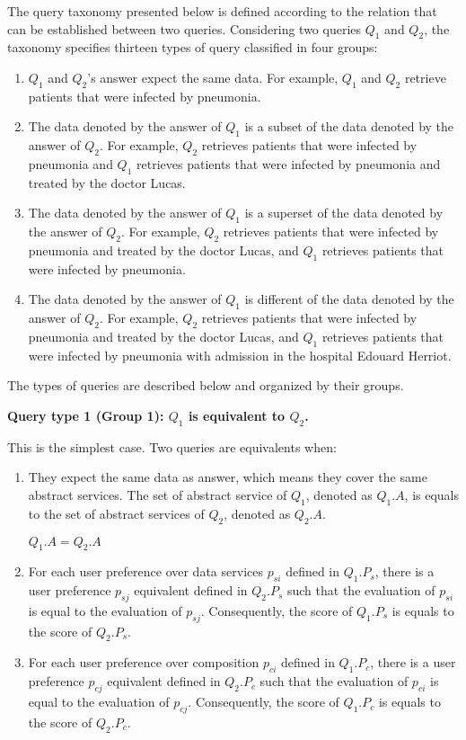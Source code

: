 The query taxonomy presented below is defined according to the relation that can be established between two queries. 
Considering two queries $Q_{1}$ and $Q_{2}$, the taxonomy specifies thirteen types of query classified in four groups: 
\begin{enumerate}
\item $Q_{1}$ and $Q_{2}$'s answer expect the same data. For example, $Q_{1}$ and $Q_{2}$ retrieve patients that were infected by pneumonia.
\item The data denoted by the answer of $Q_{1}$ is a subset of the data denoted by the answer of $Q_{2}$. For example, $Q_{2}$ retrieves patients that were infected by pneumonia and $Q_{1}$ retrieves patients that were infected by pneumonia and treated by the doctor Lucas.
\item The data denoted by the answer of $Q_{1}$ is a superset of the data denoted by the answer of $Q_{2}$. For example, $Q_{2}$ retrieves patients that were infected by pneumonia and treated by the doctor Lucas, and $Q_{1}$ retrieves patients that were infected by pneumonia.
\item The data denoted by the answer of $Q_{1}$ is different of the data denoted by the answer of $Q_{2}$. For example, $Q_{2}$ retrieves patients that were infected by pneumonia and treated by the doctor Lucas, and $Q_{1}$ retrieves patients that were infected by pneumonia with admission in the hospital Edouard Herriot.
\end{enumerate}

The types of queries are described below and organized by their groups.

\bigskip
\noindent \textbf{Query type 1 (Group 1): $Q_{1}$ is equivalent to $Q_{2}$.}

This is the simplest case. Two queries are equivalents when:
\begin{enumerate}
\item They expect the same data as answer, which means they cover the same abstract services. The set of abstract service of $Q_{1}$, denoted as $Q_{1}.A$, is equals to the set of abstract services of $Q_{2}$, denoted as $Q_{2}.A$.
%
\begin{center}
$Q_{1}.A = Q_{2}.A$
\end{center}
%
\item For each user preference over data services $p_{si}$ defined in $Q_{1}.P_{s}$, there is a user preference $p_{sj}$ equivalent defined in $Q_{2}.P_{s}$ such that the evaluation of $p_{si}$ is equal to the evaluation of $p_{sj}$. 
Consequently, the score of $Q_{1}.P_{s}$ is equals to the score of $Q_{2}.P_{s}$.
\item For each user preference over composition $p_{ci}$ defined in $Q_{1}.P_{c}$, there is a user preference $p_{cj}$ equivalent defined in $Q_{2}.P_{c}$ such that the evaluation of $p_{ci}$ is equal to the evaluation of $p_{cj}$. 
Consequently, the score of $Q_{1}.P_{c}$ is equals to the score of $Q_{2}.P_{c}$.
\end{enumerate}

